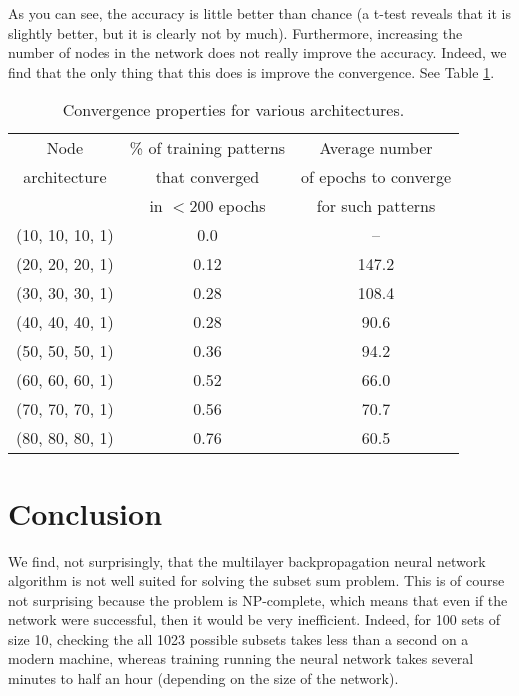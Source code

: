 \documentclass[12pt]{article}
\begin{document}
As you can see, the accuracy is little better than chance (a t-test reveals that it is slightly better, but it is clearly not by much).  Furthermore, increasing the number of nodes in the network does not really improve the accuracy.  Indeed, we find that the only thing that this does is improve the convergence.  See Table \ref{Convergence-Table}.
\begin{table}[h!]
    \begin{center}
    \begin{tabular}{|c|c|c|}
        \hline
        Node & \% of training patterns & Average number \\
        architecture &  that converged & of epochs to converge\\
         & in $< 200$ epochs &  for such patterns\\
        \hline
        (10, 10, 10, 1) & 0.0 & --\\
        \hline
        (20, 20, 20, 1) & 0.12 & 147.2\\
        \hline
        (30, 30, 30, 1) & 0.28 & 108.4\\
        \hline
        (40, 40, 40, 1) & 0.28 & 90.6\\
        \hline
        (50, 50, 50, 1) & 0.36 & 94.2\\
        \hline
        (60, 60, 60, 1) & 0.52 & 66.0\\
        \hline
        (70, 70, 70, 1) & 0.56 & 70.7\\
        \hline
        (80, 80, 80, 1) & 0.76 & 60.5\\
        \hline
    \end{tabular}
    \end{center}
    \caption{Convergence properties for various architectures.}
    \label{Convergence-Table}
\end{table}

\section{Conclusion}
We find, not surprisingly, that the multilayer backpropagation neural network algorithm is not well suited for solving the subset sum problem.  This is of course not surprising because the problem is NP-complete, which means that even if the network were successful, then it would be very inefficient.  Indeed, for 100 sets of size 10, checking the all 1023 possible subsets takes less than a second on a modern machine, whereas training running the neural network takes several minutes to half an hour (depending on the size of the network).
\end{document}
